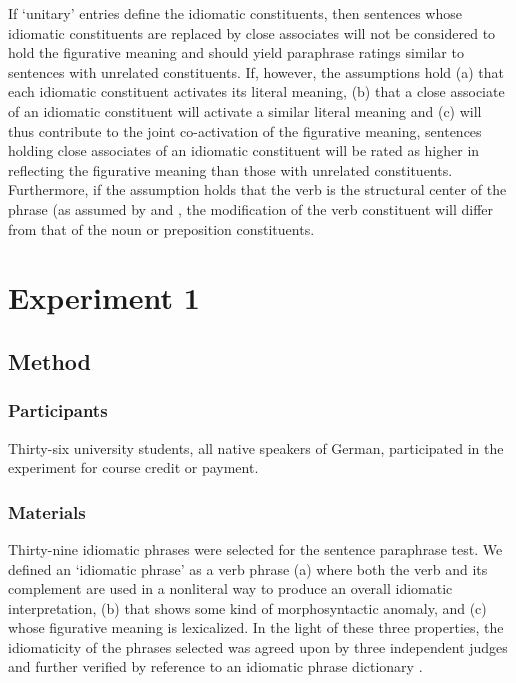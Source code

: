 If `unitary' entries define the idiomatic constituents, then sentences whose idiomatic constituents are replaced by close associates will not be considered to hold the figurative meaning and should yield paraphrase ratings similar to sentences with unrelated constituents. If, however, the assumptions hold (a) that each idiomatic constituent activates its literal meaning, (b) that a close associate of an idiomatic constituent will activate a similar literal meaning and (c) will thus contribute to the joint co-activation of the figurative meaning, sentences holding close associates of an idiomatic constituent will be rated as higher in reflecting the figurative meaning than those with unrelated constituents. Furthermore, if the assumption holds that the verb is the structural center of the phrase (as assumed by \citealt{rabanus:2008} and \citealt{smolka:2007}, the modification of the verb constituent will differ from that of the noun or preposition constituents. 


\section{Experiment 1}

\subsection{Method}
\subsubsection{Participants}
Thirty-six university students, all native speakers of German, participated in the experiment for course credit or payment.

\subsubsection{Materials}
Thirty-nine idiomatic phrases were selected for the sentence paraphrase test. We defined an ‘idiomatic phrase’ as a verb phrase (a) where both the verb and its complement are used in a nonliteral way to produce an overall idiomatic interpretation, (b) that shows some kind of morphosyntactic anomaly, and (c) whose figurative meaning is lexicalized.  In the light of these three properties, the idiomaticity of the phrases selected was agreed upon by three independent judges and further verified by reference to an idiomatic phrase dictionary \citep{redewendungen:2002}.

